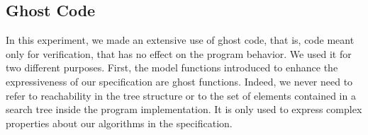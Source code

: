 \documentclass{llncs}
\newcommand{\gnatprove}{GNATprove\xspace}
\begin{document}
%
%
%

\subsection{Ghost Code}



In this experiment, we made an extensive use of ghost code, that is, code meant only for verification,
that has no effect on the program behavior. We used it for two different purposes. First, the model
functions introduced to enhance the expressiveness of our specification are ghost functions. Indeed, we
never need to refer to reachability in the tree structure or to the set of elements contained in a
search tree inside the program implementation. It is only used to express complex
properties about our algorithms in the specification.
\end{document}
